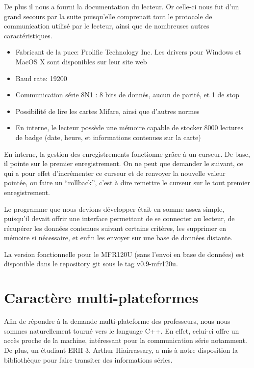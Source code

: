 De plus il nous a fourni la documentation du lecteur. Or celle-ci nous fut d'un
grand secours par la suite puisqu'elle comprenait tout le protocole de communication
utilisé par le lecteur, ainsi que de nombreuses autres caractéristiques.

    \begin{itemize}
    \item Fabricant de la puce: Prolific Technology Inc. Les drivers pour Windows
          et MacOS X sont disponibles sur leur site web \cite{prolific}
    \item Baud rate: 19200
    \item Communication série 8N1 : 8 bits de donnés, aucun de parité, et 1 de stop
    \item Possibilité de lire les cartes Mifare, ainsi que d'autres normes
    \item En interne, le lecteur possède une mémoire capable de stocker 8000
          lectures de badge (date, heure, et informations contenues sur la carte)
    \end{itemize}

En interne, la gestion des enregistrements fonctionne grâce à un curseur.
De base, il pointe sur le premier enregistrement. On ne peut que demander le suivant,
ce qui a pour effet d'incrémenter ce curseur et de renvoyer la nouvelle valeur
pointée, ou faire un ``rollback'', c'est à dire remettre le curseur sur le tout
premier enregistrement.

Le programme que nous devions développer était en somme assez simple, puisqu'il
devait offrir une interface permettant de se connecter au lecteur, de récupérer les
données contenues suivant certains critères, les supprimer en mémoire si nécessaire,
et enfin les envoyer sur une base de données distante.

La version fonctionnelle pour le MFR120U (sans l'envoi en base de données)
est disponible dans le repository git sous le tag v0.9-mfr120u.


    \section{Caractère multi-plateformes}
Afin de répondre à la demande multi-plateforme des professeurs, nous nous 
sommes naturellement tourné vers le language C++. En effet, celui-ci offre un accès
proche de la machine, intéressant pour la communication série notamment. De plus,
un étudiant ERII 3, Arthur Hiairrassary, a mis à notre disposition la bibliothèque
pour faire transiter des informations séries.

